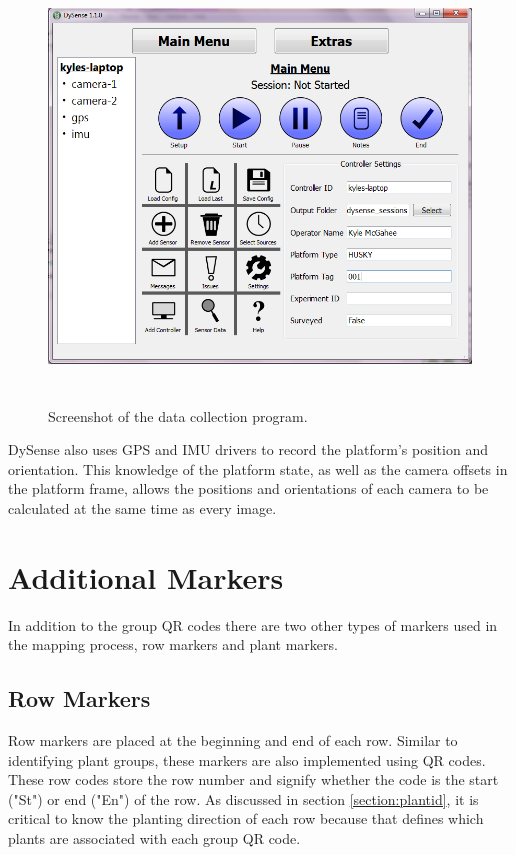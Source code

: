 \begin{figure}[htb]
	\centering
    \includegraphics[height=4.5in]{figures/dysense2.png}
    \caption[Data collection program]{Screenshot of the data collection program.}
    \label{dysense_screenshot}
\end{figure}

DySense also uses GPS and IMU drivers to record the platform's position and orientation.  This knowledge of the platform state, as well as the camera offsets in the platform frame, allows the positions and orientations of each camera to be calculated at the same time as every image.    

\section{Additional Markers}
\label{system-markers}

In addition to the group QR codes there are two other types of markers used in the mapping process, row markers and plant markers.   

\subsection{Row Markers}

Row markers are placed at the beginning and end of each row. Similar to identifying plant groups, these markers are also implemented using QR codes.  These row codes store the row number and signify whether the code is the start ("St") or end ("En") of the row. As discussed in section \ref{section:plantid}, it is critical to know the planting direction of each row because that defines which plants are associated with each group QR code.

